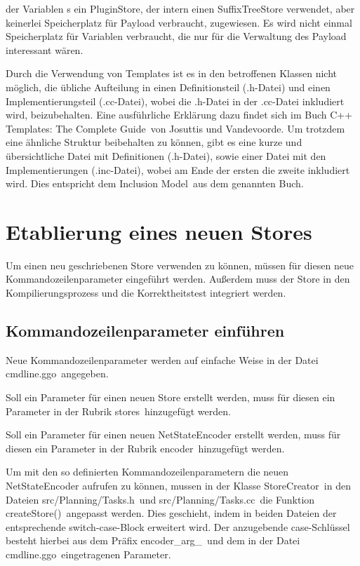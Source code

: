 \documentclass[12pt,a4paper,titlepage]{scrartcl}
\renewcommand \( {\left (}
\renewcommand \) {\right )}
\renewcommand \[ {\left [}
\renewcommand \] {\right ]}
\newcommand \Flqq {\flqq\ }
\begin{document}
der Variablen s ein PluginStore, der intern einen SuffixTreeStore verwendet, aber keinerlei Speicherplatz für Payload verbraucht, zugewiesen. Es wird nicht einmal Speicherplatz für Variablen verbraucht, die nur für die Verwaltung des Payload interessant wären.

Durch die Verwendung von Templates ist es in den betroffenen Klassen nicht möglich, die übliche Aufteilung in einen Definitionsteil (.h-Datei) und einen Implementierungsteil (.cc-Datei), wobei die .h-Datei in der .cc-Datei inkludiert wird, beizubehalten. Eine ausführliche Erklärung dazu findet sich im Buch \frqq C++ Templates: The Complete Guide\Flqq von Josuttis und Vandevoorde. Um trotzdem eine ähnliche Struktur beibehalten zu können, gibt es eine kurze und übersichtliche Datei mit Definitionen (.h-Datei), sowie einer Datei mit den Implementierungen (.inc-Datei), wobei am Ende der ersten die zweite inkludiert wird. Dies entspricht dem \frqq Inclusion Model\Flqq aus dem genannten Buch.

\section{Etablierung eines neuen Stores}
Um einen neu geschriebenen Store verwenden zu können, müssen für diesen neue Kommandozeilenparameter eingeführt werden. Außerdem muss der Store in den Kompilierungsprozess und die Korrektheitstest integriert werden.

\subsection{Kommandozeilenparameter einführen}
Neue Kommandozeilenparameter werden auf einfache Weise in der Datei \frqq cmdline.ggo\Flqq angegeben.

Soll ein Parameter für einen neuen Store erstellt werden, muss für diesen ein Parameter in der Rubrik \frqq stores\Flqq hinzugefügt werden.

Soll ein Parameter für einen neuen NetStateEncoder erstellt werden, muss für diesen ein Parameter in der Rubrik \frqq encoder\Flqq hinzugefügt werden.

Um mit den so definierten Kommandozeilenparametern die neuen NetStateEncoder aufrufen zu können, mussen in der Klasse \frqq StoreCreator\Flqq in den Dateien \frqq src/Planning/Tasks.h\Flqq und \frqq src/Planning/Tasks.cc\Flqq die Funktion \frqq createStore()\Flqq angepasst werden. Dies geschieht, indem in beiden Dateien der entsprechende switch-case-Block erweitert wird. Der anzugebende case-Schlüssel besteht hierbei aus dem Präfix \frqq encoder\_arg\_\Flqq und dem in der Datei \frqq cmdline.ggo\Flqq eingetragenen Parameter.
\end{document}
